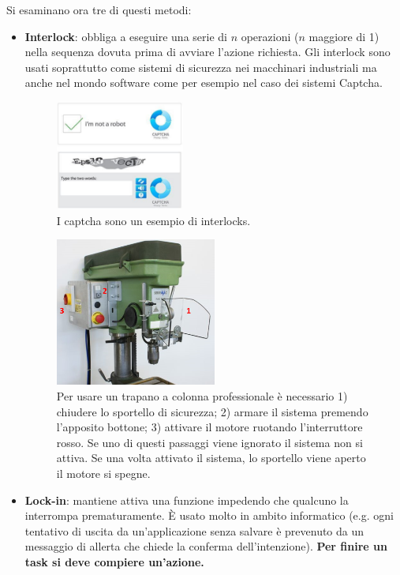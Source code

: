 Si esaminano ora tre di questi metodi:
\begin{itemize}
	\item \textbf{Interlock}: obbliga a eseguire una serie di $n$ operazioni ($n$ maggiore di 1) nella sequenza dovuta prima di avviare l'azione richiesta. Gli interlock sono usati soprattutto come sistemi di sicurezza nei macchinari industriali ma anche nel mondo software come per esempio nel caso dei sistemi Captcha.
	
	\begin{figure}[!h]
	\centering
	\includegraphics[width=0.4\textwidth]{immagini/cap.png}
	\caption{I captcha sono un esempio di interlocks.}
\end{figure}

\begin{figure}[!h]
	\centering
	\includegraphics[width=0.5\textwidth]{immagini/trapano.png}
	\caption{Per usare un trapano a colonna professionale è necessario 1) chiudere lo sportello di sicurezza; 2) armare il sistema premendo l'apposito bottone; 3) attivare il motore ruotando l'interruttore rosso. Se uno di questi passaggi viene ignorato il sistema non si attiva. Se una volta attivato il sistema, lo sportello viene aperto il motore si spegne. }
\end{figure}

	\item \textbf{Lock-in}: mantiene attiva una funzione impedendo che qualcuno la interrompa prematuramente. È usato molto in ambito informatico (e.g. ogni tentativo di uscita da un'applicazione senza salvare è prevenuto da un messaggio di allerta che chiede la conferma dell'intenzione). \textbf{Per finire un task si deve compiere un'azione.}
	

\end{itemize}
